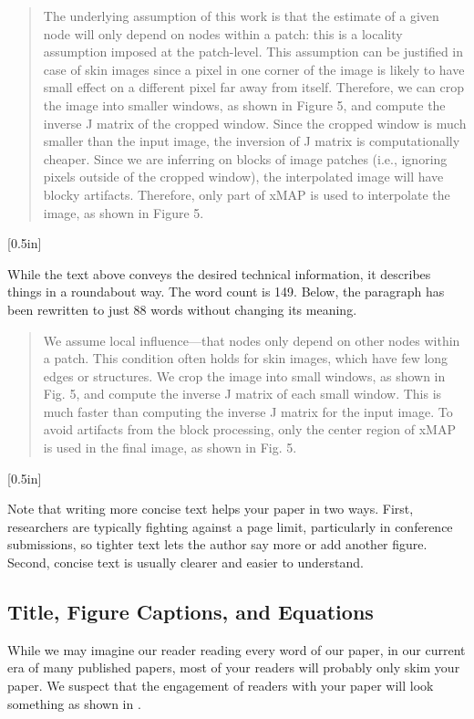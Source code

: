\begin{quote}
    The underlying assumption of this work is that the estimate of a given
    node will only depend on nodes within a patch:  this is a locality
    assumption imposed at the patch-level. This assumption can be
    justified in case of skin images since a pixel in one corner of the
    image is likely to have small effect on a different pixel far away
    from itself.  Therefore, we can crop the image into smaller windows,
    as shown in Figure 5, and compute the inverse J matrix of the cropped
    window.  Since the cropped window is much smaller than the input
    image, the inversion of J matrix is computationally cheaper.  Since we
    are inferring on blocks of image patches (i.e., ignoring pixels outside
    of the cropped window), the interpolated image will have blocky
    artifacts.  Therefore, only part of xMAP is used to interpolate the
    image, as shown in Figure 5.
\end{quote}
[0.5in]


While the text above conveys the desired technical information, it describes things in a roundabout way.  The word count is 149. Below, the paragraph has been rewritten to just 88 words without changing its meaning.

\begin{quote}
    We assume local influence---that nodes only depend on other nodes
    within a patch.  This condition often holds for skin images, which
    have few long edges or structures.  We crop the image into small
    windows, as shown in Fig. 5, and compute the inverse J matrix of each
    small window.  This is much faster than computing the inverse J matrix
    for the input image.  To avoid artifacts from the block processing,
    only the center region of xMAP is used in the final image, as shown in
    Fig. 5.
\end{quote}
[0.5in]

Note that writing more concise text helps your paper in two ways.  First, researchers are typically fighting against a page limit, particularly in conference submissions, so tighter text lets the author say more or add another figure.  Second, concise text is usually clearer and easier to understand.






\subsection{Title, Figure Captions, and Equations}
While we may imagine our reader reading every word of our paper, in our current era of many published papers, most of your readers will probably only skim your paper. We suspect that the engagement of readers with your paper will look something as shown in \fig{\ref{fig:engagement}}.

